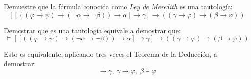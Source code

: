 \begin{ejercicio}\label{ej:1.3.5}
    Demuestre que la fórmula conocida como \emph{Ley de Meredith} es una tautología:
    \begin{equation*}
        \left[[\left((\varphi\rightarrow \psi)\rightarrow (\lnot \alpha\rightarrow\lnot \beta)\right)\rightarrow\alpha]\rightarrow \gamma\right] \rightarrow \left((\gamma\rightarrow\varphi)\rightarrow(\beta\rightarrow\varphi)\right)
    \end{equation*}

    Demostrar que es una tautología equivale a demostrar que:
    \begin{equation*}
        \models \left[[\left((\varphi\rightarrow \psi)\rightarrow (\lnot \alpha\rightarrow\lnot \beta)\right)\rightarrow\alpha]\rightarrow \gamma\right] \rightarrow \left((\gamma\rightarrow\varphi)\rightarrow(\beta\rightarrow\varphi)\right)
    \end{equation*}

    Esto es equivalente, aplicando tres veces el Teorema de la Deducción, a demostrar:
    \begin{equation*}
        [\left((\varphi\rightarrow \psi)\rightarrow (\lnot \alpha\rightarrow\lnot \beta)\right)\rightarrow\alpha]\rightarrow \gamma,~\gamma\rightarrow\varphi,~\beta \models \varphi
    \end{equation*}


\end{ejercicio}
